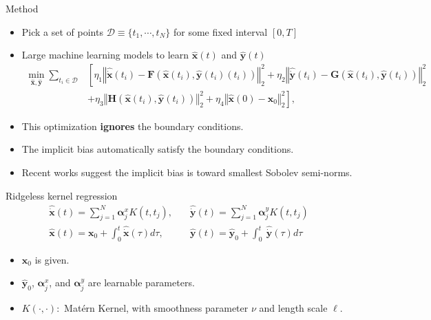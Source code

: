 \documentclass[aspectratio=169,10pt]{beamer}
\newcommand{\emphcolor}[1]{\textbf{\textcolor{emphcolorval}{#1}}}
\begin{document}
\begin{frame}{Method}
	\begin{itemize}
		\item Pick a set of points $\mathcal{D}\equiv \{t_1,\cdots,t_N\}$ for some fixed interval $[0,T]$
		\vspace{0.1in}
		\item Large machine learning models to learn $\hat{\mathbf{x}}(t)$ and $\hat{\mathbf{y}}(t)$
	\begin{align*}
		\min_{\hat{\mathbf{x}}, \hat{\mathbf{y}}} \sum_{t_i \in \mathcal{D}} &\left[\eta_1 \left\Vert \hat{\dot{\mathbf{x}}}(t_i) 
		- \mathbf{F}(\hat{\mathbf{x}}(t_i), \hat{\mathbf{y}}(t_i)(t_i)) \right\Vert_2^2 + \eta_2 \left\Vert \hat{\dot{\mathbf{y}}}(t_i) -  \mathbf{G}(\hat{\mathbf{x}}(t_i), \hat{\mathbf{y}}(t_i)) \right\Vert_2^2\right.\nonumber\\
		&\left.+ \eta_3 \left\Vert \mathbf{H}(\hat{\mathbf{x}}(t_i), \hat{\mathbf{y}}(t_i)) \right\Vert_2^2 + \eta_4 \left\Vert \hat{\mathbf{x}}(0) - \mathbf{x}_0 \right\Vert_2^2\right],
	\end{align*}
	
	\item This optimization \emphcolor{ignores} the boundary conditions.
	 \vspace{0.1in}
	\item The implicit bias automatically satisfy the boundary conditions.
	\vspace{0.1in}
	\item Recent works suggest the implicit bias is toward smallest Sobolev semi-norms.
		\end{itemize}
\end{frame}

\begin{frame}{Ridgeless kernel regression}
\begin{align*}
	\hat{\dot{\mathbf{x}}}(t) = \sum_{j=1}^{N} \boldsymbol{\alpha}^x_j K(t,t_j), &\quad \hat{\dot{\mathbf{y}}}(t) = \sum_{j=1}^{N} \boldsymbol{\alpha}^y_jK(t,t_j)\\
	\hat{\mathbf{x}}(t) = \mathbf{x}_0+ \int_0^t \hat{\dot{\mathbf{x}}}(\tau) d\tau, &\quad \hat{\mathbf{y}}(t) = \hat{\mathbf{y}}_0+ \int_0^t \ \hat{\dot{\mathbf{y}}}(\tau) d\tau 
\end{align*}
\begin{itemize}
	\item  $\mathbf{x}_0$ is given.
	\vspace{0.1in}
	\item $\hat{\mathbf{y}}_0$, $\boldsymbol{\alpha}^x_j$, and $\boldsymbol{\alpha}^y_j$ are learnable parameters. 
	\vspace{0.1in}
	\item $K(\cdot,\cdot):$ Matérn Kernel, with smoothness parameter $\nu$ and length scale $\ell$.
\end{itemize}
\end{frame}
\end{document}
